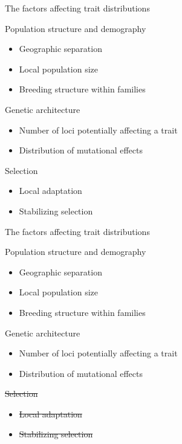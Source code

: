 \documentclass{beamer}
\begin{document}
\begin{frame}{The factors affecting trait distributions}
  \begin{block}{Population structure and demography}
    \begin{itemize}
    \item Geographic separation
    \item Local population size
    \item Breeding structure within families
    \end{itemize}
  \end{block}
  \begin{block}{Genetic architecture}
    \begin{itemize}
    \item Number of loci potentially affecting a trait
    \item Distribution of mutational effects
    \end{itemize}
  \end{block}
  \begin{block}{Selection}
    \begin{itemize}
    \item Local adaptation
    \item Stabilizing selection
    \end{itemize}
  \end{block}
\end{frame}

\begin{frame}{The factors affecting trait distributions}
  \begin{block}{Population structure and demography}
    \begin{itemize}
    \item Geographic separation
    \item Local population size
    \item Breeding structure within families
    \end{itemize}
  \end{block}
  \begin{block}{Genetic architecture}
    \begin{itemize}
    \item Number of loci potentially affecting a trait
    \item Distribution of mutational effects
    \end{itemize}
  \end{block}
  \begin{block}{\sout{Selection}}
    \begin{itemize}
    \item \sout{Local adaptation}
    \item \sout{Stabilizing selection}
    \end{itemize}
  \end{block}
\end{frame}
\end{document}
